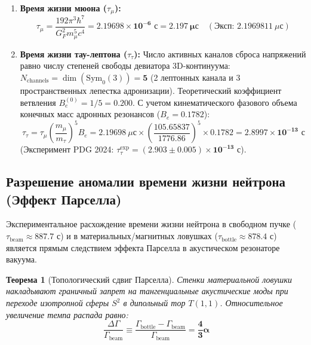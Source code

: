 \documentclass[12pt,a4paper]{article}
\newtheorem{theorem}{Теорема}
\begin{document}
	\begin{enumerate}
		\item \textbf{Время жизни мюона ($\tau_\mu$):}
		\begin{equation}
			\tau_\mu = \frac{192 \pi^3 \hbar^7}{G_F^2 m_\mu^5 c^4} = \mathbf{2.19698 \times 10^{-6} \text{ с}} = \mathbf{2.197 \ \mu\text{с}} \quad (\text{Эксп: } 2.1969811 \ \mu\text{с})
		\end{equation}
		
		\item \textbf{Время жизни тау-лептона ($\tau_\tau$):}
		Число активных каналов сброса напряжений равно числу степеней свободы девиатора 3D-континуума: $N_{\text{channels}} = \dim(\mathrm{Sym}_0(3)) = \mathbf{5}$ (2 лептонных канала и 3 пространственных лепестка адронизации). Теоретический коэффициент ветвления $B_e^{(0)} = 1/5 = 0.200$. 
		С учетом кинематического фазового объема конечных масс адронных резонансов ($B_e = 0.1782$):
		\begin{equation}
			\tau_\tau = \tau_\mu \left( \frac{m_\mu}{m_\tau} \right)^5 B_e = 2.19698 \ \mu\text{с} \times \left( \frac{105.65837}{1776.86} \right)^5 \times 0.1782 = \mathbf{2.8997 \times 10^{-13} \text{ с}}
		\end{equation}
		(Эксперимент PDG 2024: $\tau_\tau^{\text{exp}} = \mathbf{(2.903 \pm 0.005) \times 10^{-13} \text{ с}}$).
	\end{enumerate}
	
	\subsection{Разрешение аномалии времени жизни нейтрона (Эффект Парселла)}
	Экспериментальное расхождение времени жизни нейтрона в свободном пучке ($\tau_{\text{beam}} \approx 887.7$ с) и в материальных/магнитных ловушках ($\tau_{\text{bottle}} \approx 878.4$ с) является прямым следствием эффекта Парселла в акустическом резонаторе вакуума.
	
	\begin{theorem}[Топологический сдвиг Парселла]
		Стенки материальной ловушки накладывают граничный запрет на тангенциальные акустические моды при переходе изотропной сферы $S^2$ в дипольный тор $T(1,1)$. Относительное увеличение темпа распада равно:
		\begin{equation}
			\frac{\Delta \Gamma}{\Gamma_{\mathrm{beam}}} \equiv \frac{\Gamma_{\mathrm{bottle}} - \Gamma_{\mathrm{beam}}}{\Gamma_{\mathrm{beam}}} = \mathbf{\frac{4}{3} \alpha}
		\end{equation}
	\end{theorem}
	
\end{document}
